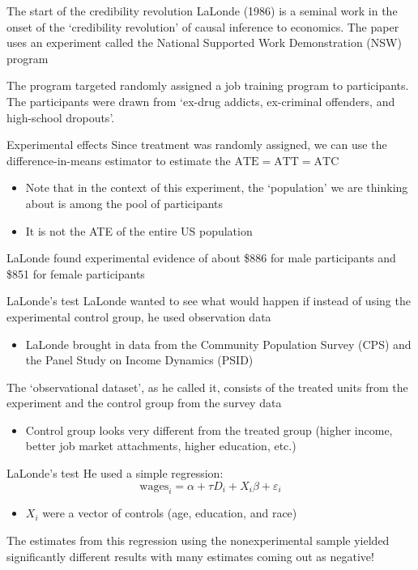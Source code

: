 \documentclass[aspectratio=169,t,11pt,table]{beamer}
\begin{document}
\begin{frame}{The start of the credibility revolution}
  LaLonde (1986) is a seminal work in the onset of the `credibility revolution' of causal inference to economics. The paper uses an experiment called the National Supported Work Demonstration (NSW) program

  \bigskip
  The program targeted randomly assigned a job training program to participants. The participants were drawn from `ex-drug addicts, ex-criminal offenders, and high-school dropouts'. 
\end{frame}

\begin{frame}{Experimental effects}
  Since treatment was randomly assigned, we can use the difference-in-means estimator to estimate the $\text{ATE} = \text{ATT} = \text{ATC}$
  \begin{itemize}
    \item Note that in the context of this experiment, the `population' we are thinking about is among the pool of participants
    \item It is not the ATE of the entire US population
  \end{itemize}
	
	\bigskip
	LaLonde found experimental evidence of about \$886 for male participants and \$851 for female participants
\end{frame}

\begin{frame}{LaLonde's test}
  LaLonde wanted to see what would happen if instead of using the experimental control group, he used observation data
	\begin{itemize}
		\item LaLonde brought in data from the Community Population Survey (CPS) and the Panel Study on Income Dynamics (PSID)  
	\end{itemize}

	\bigskip
	The `observational dataset', as he called it, consists of the treated units from the experiment and the control group from the survey data
	\pause
	\begin{itemize}
		\item Control group looks very different from the treated group (higher income, better job market attachments, higher education, etc.)
	\end{itemize}
\end{frame}

\begin{frame}{LaLonde's test}
	He used a simple regression:
	$$
		\text{wages}_i = \alpha + \tau D_i + X_i \beta + \varepsilon_i
	$$
	\begin{itemize}
		\item $X_i$ were a vector of controls (age, education, and race)
	\end{itemize}

	\pause \bigskip
	The estimates from this regression using the nonexperimental sample yielded significantly different results with many estimates coming out as negative!
\end{frame}
\end{document}
